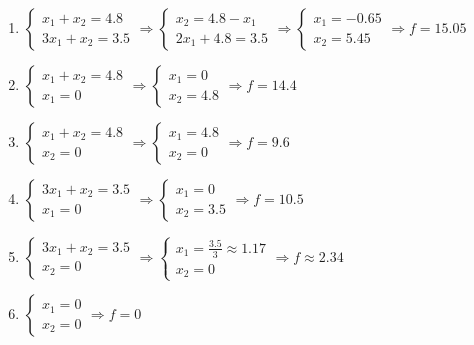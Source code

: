 \begin{enumerate}[leftmargin=*]
\item 
	\label{eq:bad_basis_1}
	$\begin{cases}
		x_1 + x_2 = 4.8 \\
		3x_1 + x_2 = 3.5
	\end{cases}
	\Rightarrow
	\begin{cases}
		x_2 = 4.8 - x_1 \\
		2x_1 + 4.8 = 3.5
	\end{cases}
	\Rightarrow
	\begin{cases}
		x_1 = -0.65 \\
		x_2 = 5.45
	\end{cases}
	\Rightarrow
	f = 15.05$
	
\item
	\label{eq:opt_basis}
	$\begin{cases}
		x_1 + x_2 = 4.8 \\
		x_1 = 0
	\end{cases}
	\Rightarrow
	\begin{cases}
		x_1 = 0 \\
		x_2 = 4.8
	\end{cases}
	\Rightarrow
	f = 14.4$
	
\item
	$\begin{cases}
		x_1 + x_2 = 4.8 \\
		x_2 = 0
	\end{cases}
	\Rightarrow
	\begin{cases}
		x_1 = 4.8 \\
		x_2 = 0
	\end{cases}
	\Rightarrow
	f = 9.6$
	
\item
	$\begin{cases}
		3x_1 + x_2 = 3.5 \\
		x_1 = 0
	\end{cases}
	\Rightarrow
	\begin{cases}
		x_1 = 0 \\
		x_2 = 3.5
	\end{cases}
	\Rightarrow
	f = 10.5$
	
\item
	$\begin{cases}
		3x_1 + x_2 = 3.5 \\
		x_2 = 0
	\end{cases}
	\Rightarrow
	\begin{cases}
		x_1 = \frac{3.5}{3} \approx 1.17 \\
		x_2 = 0
	\end{cases}
	\Rightarrow
	f \approx 2.34$
	
\item 
	\label{eq:bad_basis_2}
	$\begin{cases}
		x_1 = 0 \\
		x_2 = 0
	\end{cases}
	\Rightarrow
	f = 0$
\end{enumerate}

